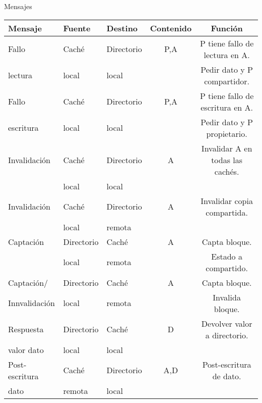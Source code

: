 \begin{frame}[t]{Mensajes}

{
\scriptsize
\begin{tabular}{|p{6.2em}|p{4em}|l|c|c|}

\hline
Mensaje & Fuente & Destino & Contenido & Función \\
\hline
\hline

Fallo & Caché & Directorio & P,A & P tiene fallo de lectura en A.\\
lectura & local & local & & Pedir dato y P compartidor.\pause\\
\hline

Fallo & Caché & Directorio & P,A & P tiene fallo de escritura en A.\\
escritura & local & local & & Pedir dato y P propietario.\pause\\
\hline

Invalidación & Caché & Directorio & A & Invalidar A en todas las cachés.\\
& local & local & & \pause \\
\hline

Invalidación & Caché & Directorio & A & Invalidar copia compartida.\\
& local & remota & & \pause \\
\hline

Captación & Directorio & Caché & A & Capta bloque.\\
& local & remota & & Estado a compartido.\pause\\
\hline

Captación/ & Directorio & Caché & A & Capta bloque.\\
Innvalidación & local & remota & & Invalida bloque.\pause\\
\hline

Respuesta & Directorio & Caché & D & Devolver valor a directorio.\\
valor dato & local & local & & \pause\\
\hline

Post-escritura & Caché & Directorio & A,D & Post-escritura de dato.\\
dato & remota & local & & \\
\hline
\end{tabular}
}
\end{frame}
